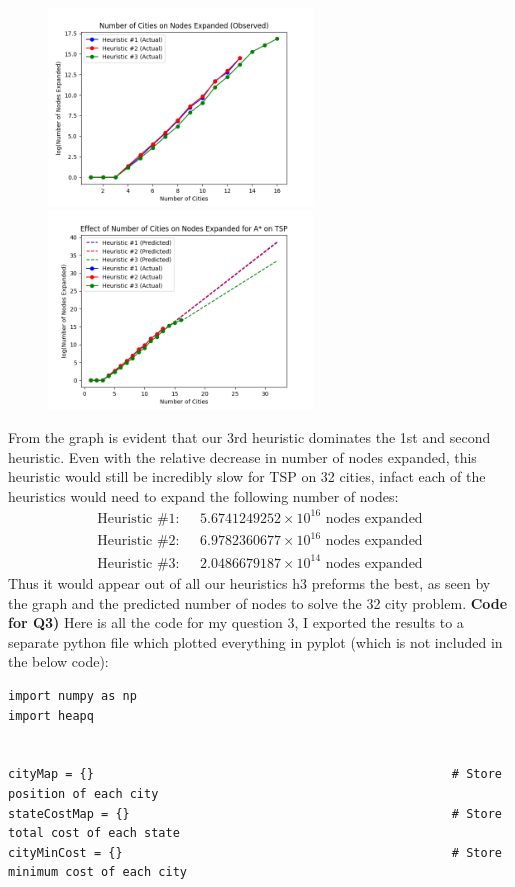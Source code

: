 \documentclass{article}
\begin{document}
\begin{titlepage}
\begin{figure}[H]
    \centering
{{\includegraphics[width=7cm]{q1Actual.png} }}%
    \qquad
{{\includegraphics[width=7cm]{q1Pred.png} }}%
\end{figure}

From the graph is evident that our 3rd heuristic dominates the 1st and second heuristic. Even with the relative decrease in number of nodes expanded, this heuristic would still be incredibly slow for TSP on 32 cities, infact each of the heuristics would need to expand the following number of nodes:
\begin{align*}
\text{Heuristic \#1}:& \text{  }5.6741249252×10^{16} \text{ nodes expanded} \\
\text{Heuristic \#2}:& \text{  }6.9782360677×10^{16} \text{ nodes expanded} \\
\text{Heuristic \#3}:& \text{  }2.0486679187×10^{14} \text{ nodes expanded}
\end{align*}
Thus it would appear out of all our heuristics h3 preforms the best, as seen by the graph and the predicted number of nodes to solve the 32 city problem.
\newpage
\textbf{Code for Q3)} Here is all the code for my question 3, I exported the results to a separate python file which plotted everything in pyplot (which is not included in the below code): \\
\begin{lstlisting}
import numpy as np
import heapq


cityMap = {}                                                  # Store position of each city
stateCostMap = {}                                             # Store total cost of each state
cityMinCost = {}                                              # Store minimum cost of each city


\end{lstlisting}
\end{titlepage}
\end{document}

